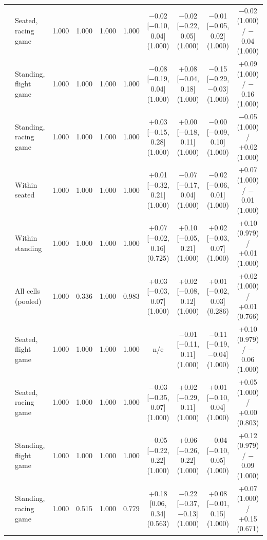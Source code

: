 \begin{table}[ht]
\begin{tabular}{@{}llcccccccc@{}}
 & Seated, racing game & 1.000 & 1.000 & 1.000 & 1.000 & $-$0.02 [$-$0.10, 0.04] (1.000) & $-$0.02 [$-$0.22, 0.05] (1.000) & $-$0.01 [$-$0.05, 0.02] (1.000) & $-$0.02 (1.000) / $-$0.04 (1.000) \\
 & Standing, flight game & 1.000 & 1.000 & 1.000 & 1.000 & $-$0.08 [$-$0.19, 0.04] (1.000) & +0.08 [$-$0.04, 0.18] (1.000) & $-$0.15 [$-$0.29, $-$0.03] (1.000) & +0.09 (1.000) / $-$0.16 (1.000) \\
 & Standing, racing game & 1.000 & 1.000 & 1.000 & 1.000 & +0.03 [$-$0.15, 0.28] (1.000) & +0.00 [$-$0.18, 0.11] (1.000) & $-$0.00 [$-$0.09, 0.10] (1.000) & $-$0.05 (1.000) / +0.02 (1.000) \\
\midrule
\sevone{} & Within seated & 1.000 & 1.000 & 1.000 & 1.000 & +0.01 [$-$0.32, 0.21] (1.000) & $-$0.07 [$-$0.17, 0.04] (1.000) & $-$0.02 [$-$0.06, 0.01] (1.000) & +0.07 (1.000) / $-$0.01 (1.000) \\
 & Within standing & 1.000 & 1.000 & 1.000 & 1.000 & +0.07 [$-$0.02, 0.16] (0.725) & +0.10 [$-$0.05, 0.21] (1.000) & +0.02 [$-$0.03, 0.07] (1.000) & +0.10 (0.979) / +0.01 (1.000) \\
 & All cells (pooled) & 1.000 & 0.336 & 1.000 & 0.983 & +0.03 [$-$0.03, 0.07] (1.000) & +0.02 [$-$0.08, 0.12] (1.000) & +0.01 [$-$0.02, 0.03] (0.286) & +0.02 (1.000) / +0.01 (0.766) \\
 & Seated, flight game & 1.000 & 1.000 & 1.000 & 1.000 & n/e & $-$0.01 [$-$0.11, 0.11] (1.000) & $-$0.11 [$-$0.19, $-$0.04] (1.000) & +0.10 (0.979) / $-$0.06 (1.000) \\
 & Seated, racing game & 1.000 & 1.000 & 1.000 & 1.000 & $-$0.03 [$-$0.35, 0.07] (1.000) & +0.02 [$-$0.29, 0.11] (1.000) & +0.01 [$-$0.10, 0.04] (1.000) & +0.05 (1.000) / +0.00 (0.803) \\
 & Standing, flight game & 1.000 & 1.000 & 1.000 & 1.000 & $-$0.05 [$-$0.22, 0.22] (1.000) & +0.06 [$-$0.26, 0.22] (1.000) & $-$0.04 [$-$0.10, 0.05] (1.000) & +0.12 (0.979) / $-$0.09 (1.000) \\
 & Standing, racing game & 1.000 & 0.515 & 1.000 & 0.779 & +0.18 [0.06, 0.34] (0.563) & $-$0.22 [$-$0.37, $-$0.13] (1.000) & +0.08 [$-$0.01, 0.15] (1.000) & +0.07 (1.000) / +0.15 (0.671) \\
\bottomrule
\end{tabular}
\end{table}
